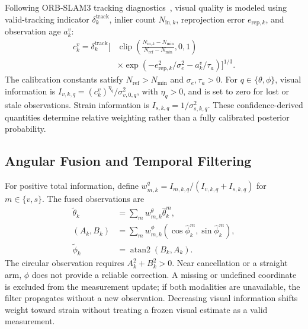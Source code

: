 \documentclass[journal,twoside]{IEEEtran}
\newcommand{\clip}{\operatorname{clip}}
\begin{document}
Following ORB-SLAM3 tracking diagnostics~\cite{campos2021orbslam3}, visual quality is modeled using valid-tracking indicator $\delta_k^{\mathrm{track}}$, inlier count $N_{\mathrm{in},k}$, reprojection error $e_{\mathrm{rep},k}$, and observation age $a_k^v$:
\begin{equation}
\begin{aligned}
c_k^v=\delta_k^{\mathrm{track}}\bigg[&\clip\left(
\frac{N_{\mathrm{in},k}-N_{\min}}{N_{\mathrm{ref}}-N_{\min}},0,1\right)\\
&\times\exp(-e_{\mathrm{rep},k}^2/\sigma_e^2-a_k^v/\tau_a)\bigg]^{1/3}.
\end{aligned}
\label{eq:visual_quality}
\end{equation}
The calibration constants satisfy $N_{\mathrm{ref}}>N_{\min}$ and $\sigma_e,\tau_a>0$. For $q\in\{\theta,\phi\}$, visual information is $I_{v,k,q}=(c_k^v)^{\eta_q}/\sigma_{v,0,q}^2$, with $\eta_q>0$, and is set to zero for lost or stale observations. Strain information is $I_{s,k,q}=1/\sigma_{s,k,q}^2$. These confidence-derived quantities determine relative weighting rather than a fully calibrated posterior probability.

\subsection{Angular Fusion and Temporal Filtering}
For positive total information, define $w_{m,k}^q=I_{m,k,q}/(I_{v,k,q}+I_{s,k,q})$ for $m\in\{v,s\}$. The fused observations are
\begin{equation}
\begin{aligned}
\tilde\theta_k&=\sum_mw_{m,k}^{\theta}\hat\theta_k^m,\\
(A_k,B_k)&=\sum_mw_{m,k}^{\phi}(\cos\hat\phi_k^m,\sin\hat\phi_k^m),\\
\tilde\phi_k&=\operatorname{atan2}(B_k,A_k).
\end{aligned}
\label{eq:angular_fusion}
\end{equation}
The circular observation requires $A_k^2+B_k^2>0$. Near cancellation or a straight arm, $\phi$ does not provide a reliable correction. A missing or undefined coordinate is excluded from the measurement update; if both modalities are unavailable, the filter propagates without a new observation. Decreasing visual information shifts weight toward strain without treating a frozen visual estimate as a valid measurement.
\end{document}
